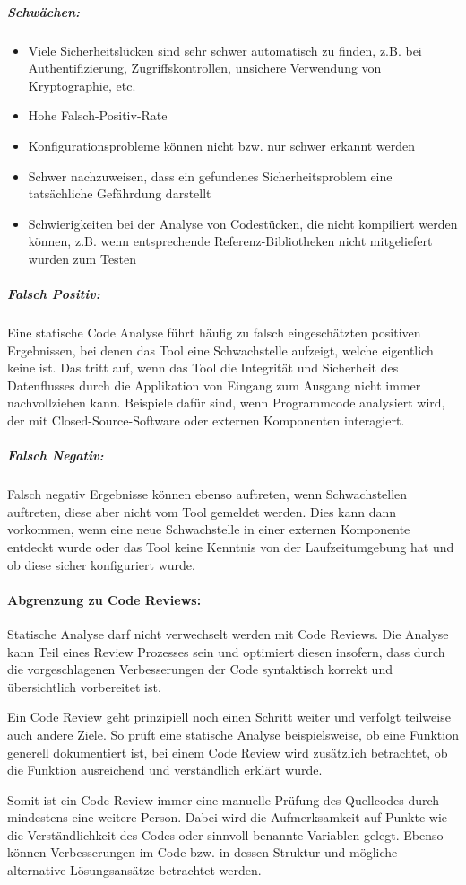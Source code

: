 \subparagraph{Schwächen:}
\begin{itemize}
\item Viele Sicherheitslücken sind sehr schwer automatisch zu finden, z.B. bei Authentifizierung, Zugriffskontrollen, unsichere Verwendung von Kryptographie, etc.
\item Hohe Falsch-Positiv-Rate
\item Konfigurationsprobleme können nicht bzw. nur schwer erkannt werden
\item Schwer nachzuweisen, dass ein gefundenes Sicherheitsproblem eine tatsächliche Gefährdung darstellt
\item Schwierigkeiten bei der Analyse von Codestücken, die nicht kompiliert werden können, z.B. wenn entsprechende Referenz-Bibliotheken nicht mitgeliefert wurden zum Testen
\end{itemize}

\subparagraph{Falsch Positiv:}
Eine statische Code Analyse führt häufig zu falsch eingeschätzten positiven Ergebnissen, bei denen das Tool eine Schwachstelle aufzeigt, welche eigentlich keine ist. Das tritt auf, wenn das Tool die Integrität und Sicherheit des Datenflusses durch die Applikation von Eingang zum Ausgang nicht immer nachvollziehen kann. Beispiele dafür sind, wenn Programmcode analysiert wird, der mit Closed-Source-Software oder externen Komponenten interagiert.

\subparagraph{Falsch Negativ:}
Falsch negativ Ergebnisse können ebenso auftreten, wenn Schwachstellen auftreten, diese aber nicht vom Tool gemeldet werden. Dies kann dann vorkommen, wenn eine neue Schwachstelle in einer externen Komponente entdeckt wurde oder das Tool keine Kenntnis von der Laufzeitumgebung hat und ob diese sicher konfiguriert wurde.

\paragraph{Abgrenzung zu Code Reviews:}
Statische Analyse darf nicht verwechselt werden mit Code Reviews. Die Analyse kann Teil eines Review Prozesses sein und optimiert diesen insofern, dass durch die vorgeschlagenen Verbesserungen der Code syntaktisch korrekt und übersichtlich vorbereitet ist.

Ein Code Review geht prinzipiell noch einen Schritt weiter und verfolgt teilweise auch andere Ziele. So prüft eine statische Analyse beispielsweise, ob eine Funktion generell dokumentiert ist, bei einem Code Review wird zusätzlich betrachtet, ob die Funktion ausreichend und verständlich erklärt wurde.

Somit ist ein Code Review immer eine manuelle Prüfung des Quellcodes durch mindestens eine weitere Person. Dabei wird die Aufmerksamkeit auf Punkte wie die Verständlichkeit des Codes oder sinnvoll benannte Variablen gelegt. Ebenso können Verbesserungen im Code bzw. in dessen Struktur und mögliche alternative Lösungsansätze betrachtet werden.
